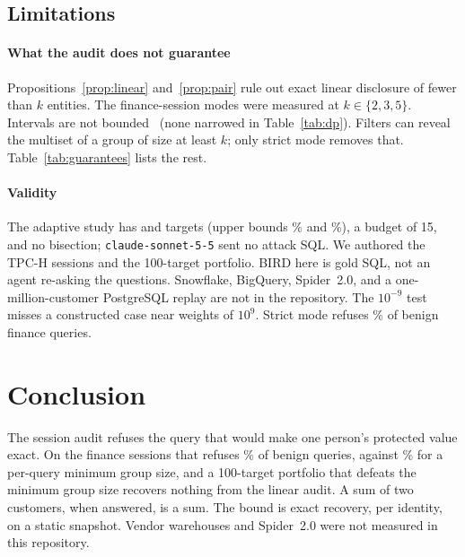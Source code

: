 \documentclass[sigconf,nonacm]{acmart}
\begin{document}
\subsection{Limitations}\label{sec:limits}
\paragraph{What the audit does not guarantee} Propositions~\ref{prop:linear} and~\ref{prop:pair} rule out exact linear disclosure of fewer than $k$ entities. The finance-session modes were measured at $k\in\{2,3,5\}$. Intervals are not bounded~\cite{li2002interval} (none narrowed in Table~\ref{tab:dp}). Filters can reveal the multiset of a group of size at least $k$; only strict mode removes that. Table~\ref{tab:guarantees} lists the rest.

\paragraph{Validity} The adaptive study has \Nadvnm{} and \Nadvno{} targets (upper bounds \Nadvmlinearhi\% and \Nadvolinearhi\%), a budget of 15, and no bisection; \texttt{claude-sonnet-5-5} sent no attack SQL. We authored the TPC-H sessions and the 100-target portfolio. BIRD here is gold SQL, not an agent re-asking the questions. Snowflake, BigQuery, Spider~2.0, and a one-million-customer PostgreSQL replay are not in the repository. The $10^{-9}$ test misses a constructed case near weights of $10^{9}$. Strict mode refuses \Nrefkthreestrict\% of benign finance queries.

\section{Conclusion}\label{sec:conclusion}
The session audit refuses the query that would make one person's protected value exact. On the finance sessions that refuses \Nrefkthreelinear\% of benign queries, against \Nrefkthreestateless\% for a per-query minimum group size, and a 100-target portfolio that defeats the minimum group size recovers nothing from the linear audit. A sum of two customers, when answered, is a sum. The bound is exact recovery, per identity, on a static snapshot. Vendor warehouses and Spider~2.0 were not measured in this repository.



\end{document}
